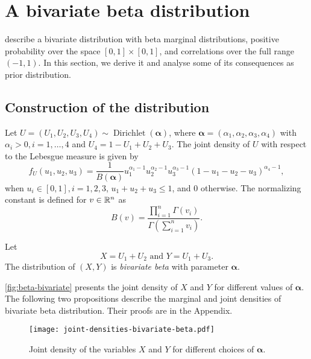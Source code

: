 \chapter{A bivariate beta distribution}
\label{appendix:bivariate-beta-distribution}

\textcite{olkin2015constructions} describe a bivariate distribution with beta
marginal distributions, positive probability over the space $[0,1] \times
[0,1]$, and correlations over the full range $(-1,1)$. In this section, we
derive it and analyse some of its consequences as prior distribution. 

\section{Construction of the distribution}

Let $U = (U_1, U_2, U_3, U_4) \sim
\operatorname{Dirichlet}(\boldsymbol{\alpha})$, where $\boldsymbol{\alpha} =
(\alpha_1, \alpha_2, \alpha_3, \alpha_4)$ with $\alpha_i > 0, i = 1,\dots,4$
and $U_4 = 1 - U_1 + U_2 + U_3$. The joint density of $U$ with respect to the
Lebesgue measure is given by
\begin{equation}
  f_U(u_1, u_2, u_3) = \frac{1}{B(\boldsymbol{\alpha})}u_1^{\alpha_1-1}u_2^{\alpha_2-1}u_3^{\alpha_3-1}(1-u_1-u_2-u_3)^{\alpha_4-1}, 
\end{equation}
when $u_i \in [0,1], i = 1,2,3$, $u_1 + u_2 + u_3 \le 1$, and $0$ otherwise.
The normalizing constant is defined for $v \in \mathbb{R}^n$ as
$$B(v) = \frac{\prod_{i=1}^n \Gamma(v_i)}{\Gamma\left(\sum_{i=1}^n v_i\right)}.$$ 
\begin{definition}
  Let 
  \begin{equation}
    X = U_1 + U_2 \text{ and } Y = U_1 + U_3.
  \end{equation} 
    The distribution of $(X,Y)$ is {\em bivariate beta} with parameter
    $\boldsymbol{\alpha}$. 
\end{definition}

\autoref{fig:beta-bivariate} presents the joint density of $X$ and $Y$ for
different values of $\boldsymbol{\alpha}$. The following two propositions describe the marginal and joint
densities of
bivariate beta distribution. Their proofs are in the Appendix. 

\begin{figure}[!ht]
  \centering
  \caption{Joint density of the variables $X$ and $Y$ for different choices of $\boldsymbol{\alpha}$.}
  \texttt{[image: joint-densities-bivariate-beta.pdf]}
  \label{fig:beta-bivariate}
\end{figure}

